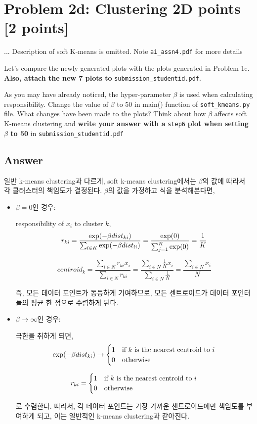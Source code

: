 \documentclass[a4paper]{article}
\begin{document}
\section*{Problem 2d: Clustering 2D points [2 points]}
... Description of soft K-means is omitted. Note \texttt{ai\_assn4.pdf} for more details

\medskip \noindent
Let’s compare the newly generated plots with the plots generated in Problem 1e. \textbf{Also, attach the new 7 plots to} \texttt{submission\_studentid.pdf}.

\medskip \noindent
As you may have already noticed, the hyper-parameter $\beta$ is used when calculating responsibility. Change the value of $\beta$ to 50 in main() function of \texttt{soft\_kmeans.py} file. What changes have been made to the plots? Think about how $\beta$ affects soft K-means clustering and
\textbf{write your answer with a} \texttt{step6} \textbf{plot when setting $\beta$ to 50} in \texttt{submission\_studentid.pdf}

\subsection*{Answer}

일반 k-means clustering과 다르게, soft k-means clustering에서는 $\beta$의 값에 따라서 각 클러스터의 책임도가 결정된다. $\beta$의 값을 가정하고 식을 분석해본다면, 

\begin{itemize}
    \item $\beta = 0$인 경우: 
    
    responsibility of $x_i$ to cluster $k$, 
    $$r_{ki} = \frac {\textnormal{exp}(-\beta dist_{ki})}{\sum_{l \in K} \textnormal{exp}(-\beta dist_{li})} = \frac {\textnormal{exp}(0)}{\sum_{j=1}^{K} \textnormal{exp}(0)} = \frac {1}{K}$$

    $$centroid_k = \frac{\sum_{i\in N} r_{ki}x_i}{\sum_{i \in N} r_{ki}} = \frac{\sum_{i\in N} \frac {1}{K}x_i}{\sum_{i \in N} \frac {1}{K}} = \frac{\sum_{i\in N} x_i}{N}$$

    즉, 모든 데이터 포인트가 동등하게 기여하므로, 모든 센트로이드가 데이터 포인터들의 평균 한 점으로 수렴하게 된다.

    \item $\beta \to \infty$인 경우:
    
    극한을 취하게 되면, 
    $$\textnormal{exp}(-\beta dist_{ki}) \to \begin{cases}
        1 & \textnormal{if $k$ is the nearest centroid to $i$} \\
        0 & \textnormal{otherwise}
    \end{cases}$$

    $$r_{ki} = \begin{cases}
        1 & \textnormal{if $k$ is the nearest centroid to $i$} \\
        0 & \textnormal{otherwise}
    \end{cases}$$

    로 수렴한다. 따라서, 각 데이터 포인트는 가장 가까운 센트로이드에만 책임도를 부여하게 되고, 이는 일반적인 k-means clustering과 같아진다.

\end{itemize}
\end{document}
